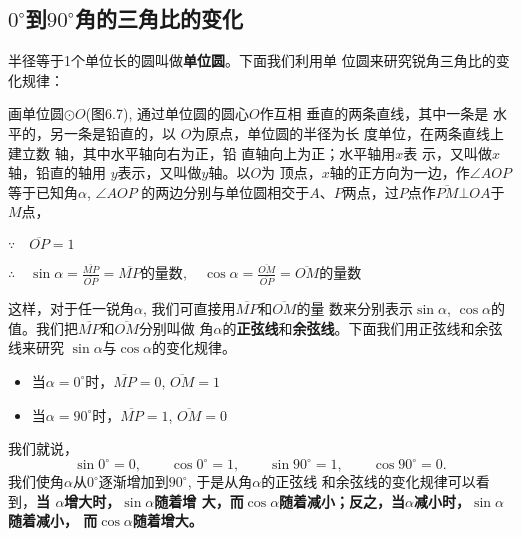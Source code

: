 \subsection{$0^{\circ}$到$90^{\circ}$角的三角比的变化}
半径等于1个单位长的圆叫做\textbf{单位圆}。下面我们利用单
位圆来研究锐角三角比的变化规律：

\begin{figure}[htp]
    \centering
{}
    \caption{}
\end{figure}


画单位圆$\odot O$(图6.7), 通过单位圆的圆心$O$作互相
垂直的两条直线，其中一条是
水平的，另一条是铅直的，以
$O$为原点，单位圆的半径为长
度单位，在两条直线上建立数
轴，其中水平轴向右为正，铅
直轴向上为正；水平轴用$x$表
示，又叫做$x$轴，铅直的轴用
$y$表示，又叫做$y$轴。以$O$为
顶点，$x$轴的正方向为一边，作$\angle AOP$等于已知角$\alpha$, $\angle AOP$
的两边分别与单位圆相交于$A$、$P$两点，过$P$点作$\overline{PM}\bot OA$于$M$点，

$\because\quad \overline{OP}=1$

$\therefore\quad \sin\alpha=\frac{\overline{MP}}{\overline{OP}}=\overline{MP}\text{的量数},\quad \cos\alpha=\frac{\overline{OM}}{\overline{OP}}=\overline{OM}\text{的量数}$

这样，对于任一锐角$\alpha$, 我们可直接用$\overline{MP}$和$\overline{OM}$的量
数来分别表示$\sin\alpha$, $\cos\alpha$的值。我们把$\overline{MP}$和$\overline{OM}$分别叫做
角$\alpha$的\textbf{正弦线}和\textbf{余弦线}。下面我们用正弦线和余弦线来研究
$\sin\alpha$与$\cos\alpha$的变化规律。

\begin{itemize}
\item 当$\alpha=0^{\circ}$时，$\overline{MP}=0$, 
$\overline{OM}=1$
\item 当$\alpha=90^{\circ}$时，$\overline{MP}=1$, 
$\overline{OM}=0$
\end{itemize}
我们就说，
\[\sin0^{\circ}=0,\qquad
\cos0^{\circ}=1,\qquad
\sin90^{\circ}=1,\qquad
\cos90^{\circ}=0.\]
我们使角$\alpha$从$0^{\circ}$逐渐增加到$90^{\circ}$, 于是从角$\alpha$的正弦线
和余弦线的变化规律可以看到，\textbf{当
$\alpha$增大时，$\sin\alpha$随着增
大，而$\cos\alpha$随着减小；反之，当$\alpha$减小时，$\sin\alpha$随着减小，
而$\cos\alpha$随着增大。}

